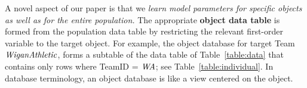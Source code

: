 {{\begin{table}[htbp]
				\caption{Sample Object Data Table, for team $\team = \it{WA}$; all rows have WA in the $T$ column. \label{table:individual}}
		\end{table}
		
		
		
		
		A novel aspect of our paper is that we {\em learn model parameters for specific objects as well as for the entire population.}
		The appropriate \textbf{object data table} is formed from the population data table by restricting the relevant first-order variable to the target object. 
		For example, the object database for target Team $\it{Wigan Athletic}$, 
		forms a subtable of the data table of Table~\ref{table:data} that contains only rows where 
		TeamID = $\it{WA}$; see Table~\ref{table:individual}. In database terminology, an object database is like a view centered on the object.
		
		\begin{table} 


\end{table}}}
